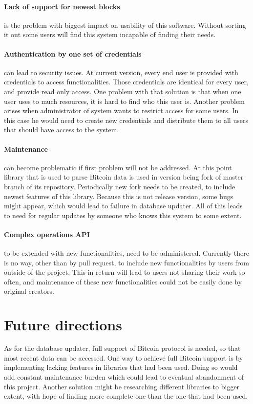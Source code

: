 \documentclass[12pt, en, eng, oneside, final]{mgr}
\begin{document}
\paragraph{Lack of support for newest blocks} is the problem with biggest impact on usability of this software. Without sorting it out some users will find this system incapable of finding their needs. 

\paragraph{Authentication by one set of credentials} can lead to security issues. At current version, every end user is provided with credentials to access functionalities. Those credentials are identical for every user, and provide read only access. One problem with that solution is that when one user uses to much resources, it is hard to find who this user is. Another problem arises when administrator of system wants to restrict access for some users. In this case he would need to create new credentials and distribute them to all users that should have access to the system.

\paragraph{Maintenance} can become problematic if first problem will not be addressed. At this point library that is used to parse Bitcoin data is used in version being fork of master branch of its repository. Periodically new fork needs to be created, to include newest features of this library. Because this is not release version, some bugs might appear, which would lead to failure in database updater. All of this leads to need for regular updates by someone who knows this system to some extent. 

\paragraph{Complex operations API} to be extended with new functionalities, need to be administered. Currently there is no way, other than by pull request, to include new functionalities by users from outside of the project. This in return will lead to users not sharing their work so often, and maintenance of these new functionalities could not be easily done by original creators.

\section{Future directions}
As for the database updater, full support of Bitcoin protocol is needed, so that most recent data can be accessed. One way to achieve full Bitcoin support is by implementing lacking features in libraries that had been used. Doing so would add constant maintenance burden which could lead to eventual abandonment of this project. Another solution might be researching different libraries to bigger extent, with hope of finding more complete one than the one that had been used.
\end{document}
